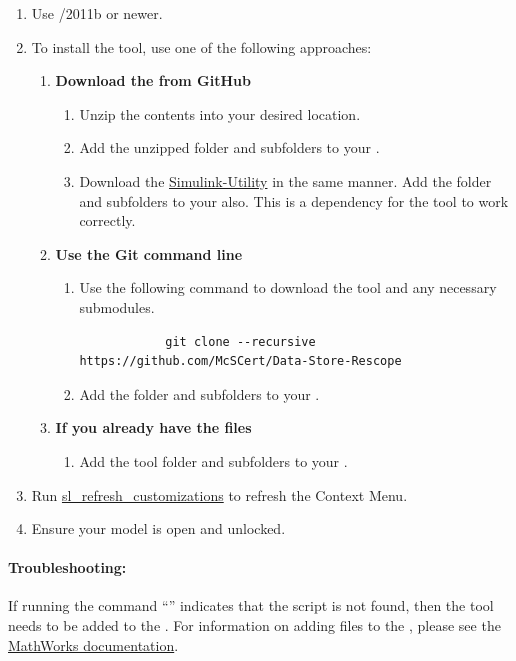 \documentclass{article}
\begin{document}
\begin{enumerate}
  \item Use \Matlab/\Simulink 2011b or newer.
	\item To install the tool, use one of the following approaches:
	\begin{enumerate}
		\item \textbf{Download the  from GitHub}
		\begin{enumerate} 
			\item Unzip the contents into your desired location. 
			\item Add the unzipped folder and subfolders to your \mpath. 
			\item Download the \href{https://github.com/McSCert/Simulink-Utility}{Simulink-Utility} in the same manner. Add the folder and subfolders to your \mpath also. This is a dependency for the tool to work correctly.
		\end{enumerate}
		\item \textbf{Use the Git command line}
		\begin{enumerate}
			\item Use the following command to download the tool and any necessary submodules. 
			\begin{verbatim}
			git clone --recursive https://github.com/McSCert/Data-Store-Rescope
			\end{verbatim}
			\item Add the folder and subfolders to your \mpath. 
		\end{enumerate}
		\item \textbf{If you already have the files}
		\begin{enumerate}
			\item Add the tool folder and subfolders to your \mpath. 
		\end{enumerate}
	\end{enumerate}
	\item Run \href{https://www.mathworks.com/help/simulink/ug/registering-customizations.html}{sl\_refresh\_customizations} to refresh the Context Menu. 
	\item Ensure your model is open and unlocked.
\end{enumerate}

\paragraph{Troubleshooting:} If running the command ``'' indicates that the script is not found, then the tool needs to be added to the \mpath. For information on adding files to the \mpath, please see the \href{https://www.mathworks.com/help/matlab/matlab_env/add-remove-or-reorder-folders-on-the-search-path.html}{MathWorks documentation}.
\end{document}
